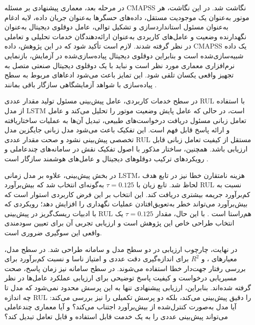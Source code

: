 در مرحله بعد، معماری پیشنهادی بر مسئله \gls{CMAPSS} نگاشت شد. در
این نگاشت، هر موتور به‌عنوان یک موجودیت مستقل، داده‌های حسگرها
به‌عنوان جریان داده، لایه ادغام به‌عنوان مسئول استانداردسازی و
تشکیل توالی، عامل دوقلوی دیجیتال به‌عنوان نگهدارنده وضعیت و
عامل‌های کاربردی به‌عنوان ارائه‌دهندگان خدمات تحلیلی و تعاملی
در نظر گرفته شدند. لازم است تأکید شود که در این پژوهش، داده
\gls{CMAPSS} یک داده شبیه‌سازی‌شده است و بنابراین دوقلوی دیجیتال
پیاده‌سازی‌شده در آزمایش، بازنمایی نرم‌افزاری معماری مورد نظر
است و نباید با یک دوقلوی دیجیتال صنعتی متصل به تجهیز واقعی
یکسان تلقی شود. این تمایز باعث می‌شود ادعاهای مربوط به سطح
پیاده‌سازی با شواهد آزمایشگاهی سازگار باقی بمانند
\cite{qi2021enabling,tao2018digital}.

در سطح خدمات کاربردی، عامل پیش‌بینی مسئول تولید مقدار عددی
\gls{RUL} با استفاده از مدل \gls{LSTM} است، در حالی که عامل
پایش وضعیت موتور را تحلیل می‌کند و عامل تعامل زبانی مسئول
دریافت درخواست‌های طبیعی، تبدیل آن‌ها به عملیات ساختاریافته و
ارائه پاسخ قابل فهم است. این تفکیک باعث می‌شود مدل زبانی جایگزین
مدل تخصصی پیش‌بینی نشود و صحت مقدار عددی \gls{RUL} مستقل از
کیفیت تعامل زبانی قابل ارزیابی باشد. همچنین، ساختار مذکور با
اصول تفکیک نقش در سامانه‌های چندعاملی و رویکردهای ترکیب
دوقلوهای دیجیتال و عامل‌های هوشمند سازگار است
\cite{lopez2024madtwin,pretel2022masdt}.

در بخش پیش‌بینی، علاوه بر مدل زمانی \gls{LSTM}، هزینه نامتقارن
خطا نیز در تابع هدف لحاظ شد. تابع زیان  با
$\tau=0.125$ به‌گونه‌ای انتخاب شد که بیش‌برآورد \gls{RUL} نسبت
به کم‌برآورد جریمه بیشتری دریافت کند. این انتخاب بر این فرض
کاربردی استوار است که بیش‌برآورد می‌تواند خطر به‌تعویق‌افتادن
عملیات نگهداری را افزایش دهد؛ رویکردی که با ادبیات
ریسک‌گریز در پیش‌بینی \gls{RUL} هم‌راستا است
\cite{Robinson2026riskaware}. با این حال، مقدار $\tau=0.125$
یک انتخاب طراحی خاص این پژوهش است و ارزیابی تجربی آن برای
تعیین سودمندی واقعی این سوگیری ضروری است.

در نهایت، چارچوب ارزیابی در دو سطح مدل و سامانه طراحی شد. در
سطح مدل، معیارهای ،  و $R^2$ برای اندازه‌گیری
دقت عددی و امتیاز ناسا و نسبت کم‌برآورد برای بررسی رفتار
جهت‌دار خطا استفاده می‌شوند. در سطح سامانه نیز زمان پاسخ،
صحت مسیریابی درخواست و کیفیت پاسخ توضیحی برای ارزیابی عملکرد
عامل‌ها در نظر گرفته شده‌اند. بنابراین، ارزیابی پیشنهادی تنها
به این پرسش محدود نمی‌شود که مدل تا چه اندازه \gls{RUL} را
دقیق پیش‌بینی می‌کند، بلکه دو پرسش تکمیلی را نیز بررسی می‌کند:
آیا مدل به‌صورت کنترل‌شده از بیش‌برآورد اجتناب می‌کند؟ و آیا
معماری چندعاملی می‌تواند پیش‌بینی عددی را به یک خدمت قابل
استفاده و قابل تعامل تبدیل کند؟

